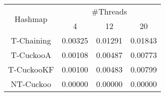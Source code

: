 \begin{tabular}{|c|c|c|c|}
\hline
\multirow{2}{*}{Hashmap} & \multicolumn{3}{c|}{\#Threads}\\\cline{2-4}& 4 & 12 & 20\\
\hline
\hline
T-Chaining & 0.00325 & 0.01291 & 0.01843\\
T-CuckooA & 0.00108 & 0.00487 & 0.00773\\
T-CuckooKF & 0.00100 & 0.00483 & 0.00799\\
NT-Cuckoo & 0.00000 & 0.00000 & 0.00000\\
\hline
\end{tabular}
